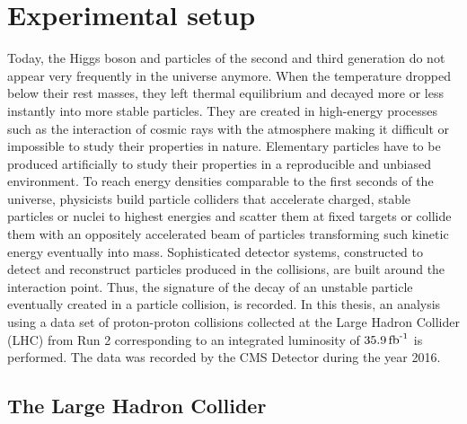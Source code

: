 
\chapter{Experimental setup}\label{chap:cms}

Today, the Higgs boson and  particles of the second and third generation do not appear very frequently in the universe anymore. When the temperature dropped below their rest masses, they left thermal equilibrium and decayed more or less instantly into more stable particles. 
They are created in high-energy processes such as the interaction of cosmic rays with the atmosphere making it difficult or impossible to study their properties in nature.
Elementary particles have to be produced artificially to study their properties in a reproducible and unbiased environment. To reach energy densities comparable to the first seconds of the universe,
physicists build particle colliders that accelerate charged, stable particles or nuclei to highest energies and scatter them at fixed targets or collide them with an oppositely accelerated beam of particles transforming such kinetic energy eventually into mass.
Sophisticated detector systems, constructed to detect and reconstruct particles produced in the collisions, are built around the interaction point. Thus, the signature of the decay of an unstable particle
eventually created in a particle collision, is recorded.
In this thesis, an analysis using a data set of proton-proton collisions collected at the Large Hadron Collider (LHC) from Run 2 corresponding to an
integrated luminosity of $\text{35.9\,fb}^\text{-1}$ is performed. The data was recorded by the CMS Detector during the year 2016. 

\section{The Large Hadron Collider}\label{sec:LHC}

